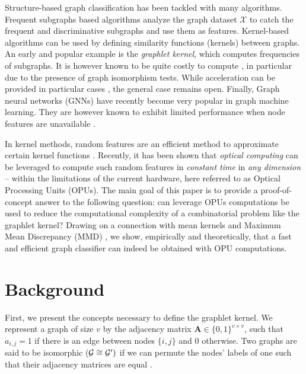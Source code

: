 \documentclass{article}
\begin{document}
Structure-based graph classification has been tackled with many algorithms. Frequent subgraphs based algorithms \cite{frequent_subgraphs} analyze the graph dataset $\mathcal{X}$ to catch the frequent and discriminative subgraphs and use them as features. Kernel-based algorithms \cite{kriege_graph_kernels} can be used by defining similarity functions (kernels) between graphs. An early and popular example is the \emph{graphlet kernel}, which computes frequencies of subgraphs. It is however known to be quite costly to compute \cite{graphlet_kernel}, in particular due to the presence of graph isomorphism tests. While acceleration can be provided in particular cases \cite{Fast_graphlet}, the general case remains open.
Finally, Graph neural networks (GNNs) \cite{GNN_bruna, GNN_review} have recently become very popular in graph machine learning. They are however known to exhibit limited performance when node features are unavailable \cite{GNN_limits}. %

In kernel methods, random features are an efficient method to approximate certain kernel functions \cite{Rahimi, RF_1}. Recently, it has been shown that \emph{optical computing} can be leveraged to compute such random features in \emph{constant time} in \emph{any dimension} -- within the limitations of the current hardware, here referred to as Optical Processing Units (OPUs).
The main goal of this paper is to provide a proof-of-concept answer to the following question: can leverage OPUs computations be used to reduce the computational complexity of a combinatorial problem like the graphlet kernel? Drawing on a connection with mean kernels and Maximum Mean Discrepancy (MMD) \cite{gretton}, we show, empirically and theoretically, that a fast and efficient graph classifier can indeed be obtained with OPU computations.

\section{Background}
\label{sec:background}
First, we present the concepts necessary to define the graphlet kernel. We represent a graph of size $v$ by the adjacency matrix $\mathbf{A}\in \{0,1\}^{v\times v}$, such that $a_{i,j} =1$ if there is an edge between nodes $\{i,j\}$ and $0$ otherwise. Two graphs are said to be isomorphic ($\mathcal{G}\cong \mathcal{G}')$ if we can permute the nodes' labels of one such that their adjacency matrices are equal \cite{isomorphism}. 
\end{document}

